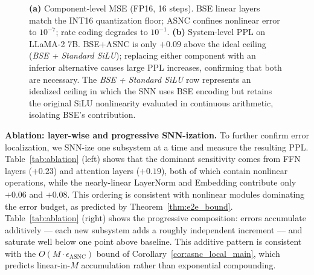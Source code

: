\documentclass{article}
\theoremstyle{plain}
\theoremstyle{definition}
\theoremstyle{remark}
\begin{document}
\begin{figure}[h!]
\begin{minipage}[c]{0.50\textwidth}
\begin{tabular}{lc}
\bottomrule
\end{tabular}
\end{minipage}
\caption{\textbf{(a)} Component-level MSE (FP16, 16 steps). BSE linear layers match
the INT16 quantization floor; ASNC confines nonlinear error to $10^{-7}$; rate coding
degrades to $10^{-1}$. \textbf{(b)} System-level PPL on LLaMA-2 7B. BSE+ASNC is
only $+0.09$ above the ideal ceiling (\textit{BSE + Standard SiLU}); replacing either
component with an inferior alternative causes large PPL increases, confirming that both
are necessary. The \textit{BSE + Standard SiLU} row represents an idealized ceiling in
which the SNN uses BSE encoding but retains the original SiLU nonlinearity evaluated
in continuous arithmetic, isolating BSE's contribution.}
\label{fig:component_mse}
\end{figure}

\noindent\textbf{Ablation: layer-wise and progressive SNN-ization.}
To further confirm error localization, we SNN-ize one subsystem at a time and measure
the resulting PPL. Table~\ref{tab:ablation} (left) shows that the dominant
sensitivity comes from FFN layers ($+0.23$) and attention layers ($+0.19$), both of
which contain nonlinear operations, while the nearly-linear LayerNorm and Embedding
contribute only $+0.06$ and $+0.08$. This ordering is consistent with nonlinear
modules dominating the error budget, as predicted by Theorem~\ref{thm:e2e_bound}.
Table~\ref{tab:ablation} (right) shows the progressive composition: errors accumulate
additively — each new subsystem adds a roughly independent increment — and saturate
well below one point above baseline. This additive pattern is consistent with the
$O(M \cdot \epsilon_{\mathrm{ASNC}})$ bound of Corollary~\ref{cor:asnc_local_main},
which predicts linear-in-$M$ accumulation rather than exponential compounding.
\end{document}
